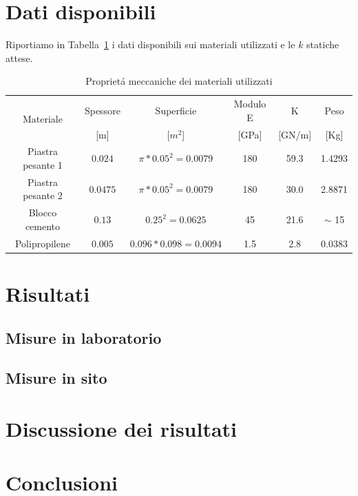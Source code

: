 \documentclass[12pt,a4paper]{article}
\begin{document}
		
\section{Dati disponibili}
	Riportiamo in Tabella~\ref{tab:material}  i dati disponibili sui materiali utilizzati e le $k$ statiche attese.
	
\begin{table}[]
	\centering
	\caption{Propriet\'a meccaniche dei materiali utilizzati}
	\label{tab:material}
	\begin{tabular}{cccccc}
		\hline\hline
		\multirow{2}{*}{Materiale} & Spessore&Superficie&Modulo E & K&Peso\\
		&[m]& [$m^2$]& [GPa]&[GN/m]& [Kg]\\
		\hline
		Piastra pesante 1&$0.024$	& $\pi* 0.05^2=0.0079$	& 180	& 59.3	& 1.4293	\\
		Piastra pesante 2&$0.0475$	& $\pi* 0.05^2=0.0079$	& 180	& 30.0	& 2.8871	\\
		Blocco cemento	&$0.13 $	& $0.25^2=0.0625$		& 45 	& 21.6	& $\sim$ 15	\\
		Polipropilene	&$0.005$	& $0.096*0.098=0.0094$	& 1.5	&  2.8	& 0.0383	\\
		\hline\hline
	\end{tabular}
\end{table}

\section{Risultati}
	\subsection{Misure in laboratorio}
	\subsection{Misure in sito}
\section{Discussione dei risultati}
\section{Conclusioni}

 












 
 
\end{document}
